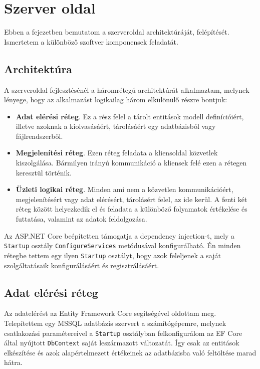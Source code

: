 \chapter{Szerver oldal}
\label{chapt:birdmap-backend}
Ebben a fejezetben bemutatom a szerveroldal architektúráját, felépítését. Ismertetem a különböző szoftver komponensek feladatát.

\section{Architektúra}
A szerveroldal fejlesztésénél a háromrétegú architektúrát alkalmaztam, melynek lényege, hogy az alkalmazást logikailag három elkülönülő részre bontjuk:
\begin{itemize}
    \item \textbf{Adat elérési réteg}. Ez a rész felel a tárolt entitások modell definícióiért, illetve azoknak a kiolvasásáért, tárolásáért egy adatbázisból vagy fájlrendszerből.
    \item \textbf{Megjelenítési réteg}. Ezen réteg feladata a kliensoldal közvetlek kiszolgálása. Bármilyen irányú kommunikáció a kliensek felé ezen a rétegen keresztül történik.
    \item \textbf{Üzleti logikai réteg}. Minden ami nem a közvetlen kommunikációért, megjelenítésért vagy adat elérésért, tárolásért felel, az ide kerül.
    A fenti két réteg között helyezkedik el és feladata a különböző folyamatok értékelése és futtatása, valamint az adatok feldolgozása.
\end{itemize}

Az ASP.NET Core beépítetten támogatja a dependency injection-t, mely a \verb+Startup+ osztály \verb+ConfigureServices+ metódusával konfigurálható.
Én minden rétegbe tettem egy ilyen \verb+Startup+ osztályt, hogy azok feleljenek a saját szolgáltatásaik konfigurálásáért és regisztrálásáért.

\section{Adat elérési réteg}
Az adatelérést az Entity Framework Core segítségével oldottam meg. Telepítettem egy MSSQL adatbázis szervert a számítógépemre, melynek csatlakozási paramétereivel
a \verb+Startup+ osztályban felkonfigurálom az EF Core által nyújtott \verb+DbContext+ saját leszármazott változatát. 
Így csak az entitások elkészítése és azok alapértelmezett értékeinek az adatbázisba való feltöltése marad hátra.


